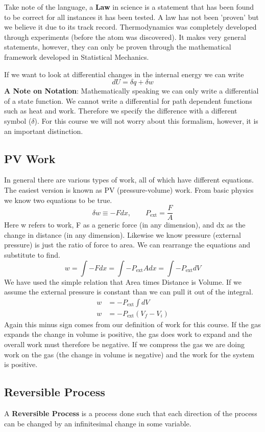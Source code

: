 \documentclass{article}
\newcommand{\be}{\begin{equation}}
\newcommand{\ee}{\end{equation}}
\begin{document}
Take note of the language, a \textbf{Law} in science is a statement that has been found to be correct for all instances it has been tested. 
A law has not been 'proven' but we believe it due to its track record. 
Thermodynamics was completely developed through experiments (before the atom was discovered). 
It makes very general statements, however, they can only be proven through the mathematical framework developed in Statistical Mechanics. 

If we want to look at differential changes in the internal energy we can write
\be
dU = \delta q + \delta w
\ee
\textbf{A Note on Notation}: Mathematically speaking we can only write a differential of a state function.
We cannot write a differential for path dependent functions such as heat and work.
Therefore we specify the difference with a different symbol ($\delta$).
For this course we will not worry about this formalism, however, it is an important distinction. 

\subsection*{PV Work}
In general there are various types of work, all of which have different equations.
The easiest version is known as PV (pressure-volume) work. 
From basic physics we know two equations to be true. 
\be
\delta w \equiv -F dx, \qquad P_{\text{ext}} = \frac{F}{A}
\ee
Here w refers to work, F as a generic force (in any dimension), and dx as the change in distance (in any dimension). 
Likewise we know pressure (external pressure) is just the ratio of force to area. 
We can rearrange the equations and substitute to find. 
\be
w = \int -F dx = \int -P_{\text{ext}} A dx = \int -P_{\text{ext}} dV
\ee
We have used the simple relation that Area times Distance is Volume.
If we assume the external pressure is constant than we can pull it out of the integral.
\be
\begin{split}
w &= -P_{\text{ext}} \int dV \\
w &= -P_{\text{ext}} (V_f - V_i)
\end{split}
\ee
Again this minus sign comes from our definition of work for this course. 
If the gas expands the change in volume is positive, the gas does work to expand and the overall work must therefore be negative. 
If we compress the gas we are doing work on the gas (the change in volume is negative) and the work for the system is positive. 

\subsection*{Reversible Process}
A \textbf{Reversible Process} is a process done such that each direction of the process can be changed by an infinitesimal change in some variable. 
\end{document}
